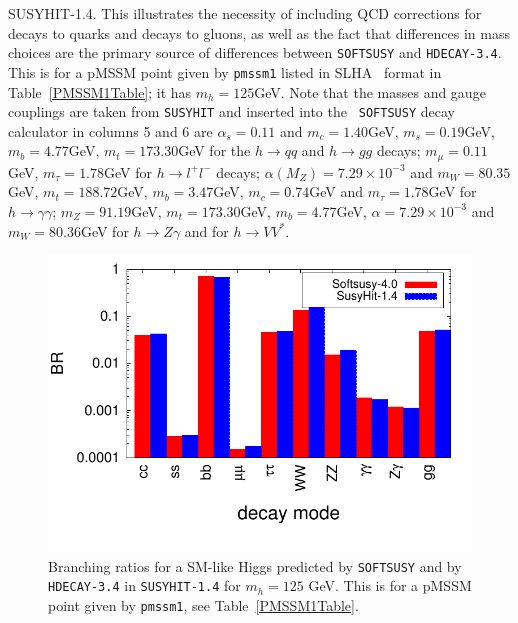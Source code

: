 \documentclass[final,3p,times]{elsarticle}
\begin{document}
\begin{center}
\begin{table}
{{    SUSYHIT-1.4}. This illustrates the necessity of including QCD corrections
  for decays to quarks and decays to gluons, as well as the fact that
  differences in mass choices are the primary source of differences between
  {\tt SOFTSUSY} and {\tt HDECAY-3.4}. This is for a pMSSM point given by {\tt pmssm1}
  listed in SLHA~\cite{Skands:2003cj} format in Table~\ref{PMSSM1Table}; it
  has $m_h = 125$GeV. Note that the masses
  and gauge couplings are taken from {\tt SUSYHIT} and inserted into the {\tt
    SOFTSUSY}\/ decay calculator in columns 5 and 6 are $\alpha_s = 0.11$ and
  $m_c = 
  1.40$GeV,   $m_s = 0.19$GeV, $m_b = 4.77$GeV, $m_t = 173.30$GeV for
  the $h \rightarrow qq$ 
  and $h \rightarrow gg$ decays; $m_{\mu} = 0.11$GeV, $m_{\tau} = 1.78$GeV for
  $h \rightarrow l^+ l^-$ decays; $\alpha(M_Z) = 7.29\times10^{-3}$ and $m_W =
  80.35$GeV, $m_t = 188.72$GeV, $m_b = 3.47$GeV, $m_c = 0.74$GeV and $m_{\tau}
  = 1.78$GeV for $h \rightarrow \gamma \gamma$; $m_Z = 91.19$GeV, $m_t =
  173.30$GeV, $m_b = 4.77$GeV, $\alpha = 7.29\times10^{-3}$ and $m_W =
  80.36$GeV for $h \rightarrow Z \gamma$ and %
 for $h  \rightarrow VV^*$.}  
\label{h0SMliketable}
\end{table}
\end{center}


\begin{figure}%
\centerline{\includegraphics[scale=1]{figure1option2.pdf}} 
\caption{Branching ratios for a SM-like Higgs predicted by {\tt SOFTSUSY} and
  by {\tt HDECAY-3.4} in {\tt SUSYHIT-1.4} for $m_h=125$
  GeV. This is for a pMSSM point given by {\tt pmssm1}, see Table~\ref{PMSSM1Table}.} \label{h0SMBRsbarplot} 
\end{figure}
\end{document}
